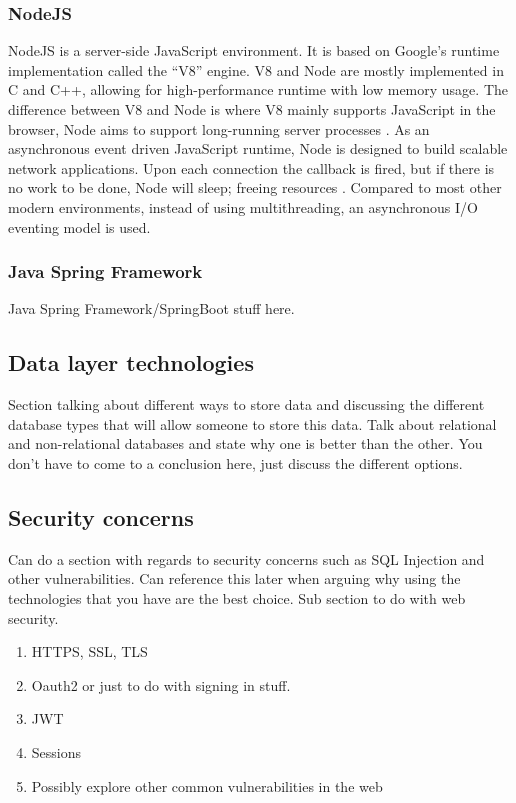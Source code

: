 \subsubsection{NodeJS}
NodeJS is a server-side JavaScript environment. It is based on Google's runtime implementation called the ``V8'' engine.
V8 and Node are mostly implemented in C and C++, allowing for high-performance runtime with low memory usage.
The difference between V8 and Node is where V8 mainly supports JavaScript in the browser, Node aims to support long-running 
server processes \cite{tilkov2010node}.
As an asynchronous event driven JavaScript runtime, Node is designed to build scalable network applications. 
Upon each connection the callback is fired, but if there is no work to be done, Node will sleep; freeing resources \cite{nodejs2019}.
Compared to most other modern environments, instead of using multithreading, an asynchronous I/O eventing model is used.


\subsubsection{Java Spring Framework}
Java Spring Framework/SpringBoot stuff here.

\subsection{Data layer technologies}
Section talking about different ways to store data and discussing the different database types
that will allow someone to store this data. Talk about relational and non-relational databases and
state why one is better than the other. You don't have to come to a conclusion here, just discuss
the different options.


\subsection{Security concerns}

Can do a section with regards to security concerns such as SQL Injection and other vulnerabilities.
Can reference this later when arguing why using the technologies that you have are the best choice.
Sub section to do with web security.
\begin{enumerate}
    \item HTTPS, SSL, TLS
    \item Oauth2 or just to do with signing in stuff.
    \item JWT
    \item Sessions
    \item Possibly explore other common vulnerabilities in the web
\end{enumerate}